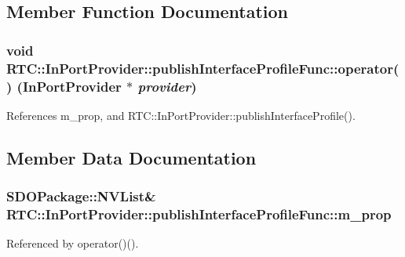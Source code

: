 \subsection{Member Function Documentation}
\subsubsection[{operator()}]{\setlength{\rightskip}{0pt plus 5cm}void RTC::InPortProvider::publishInterfaceProfileFunc::operator() ({\bf InPortProvider} $\ast$ {\em provider})\hspace{0.3cm}{\ttfamily  [inline]}}\label{structRTC_1_1InPortProvider_1_1publishInterfaceProfileFunc_a711966bf1724cf6b95bf4b98d3b8f413}


References m\_\-prop, and RTC::InPortProvider::publishInterfaceProfile().



\subsection{Member Data Documentation}
\subsubsection[{m\_\-prop}]{\setlength{\rightskip}{0pt plus 5cm}SDOPackage::NVList\& {\bf RTC::InPortProvider::publishInterfaceProfileFunc::m\_\-prop}}\label{structRTC_1_1InPortProvider_1_1publishInterfaceProfileFunc_a3164cb46caa495916feb8e70f222804b}


Referenced by operator()().


